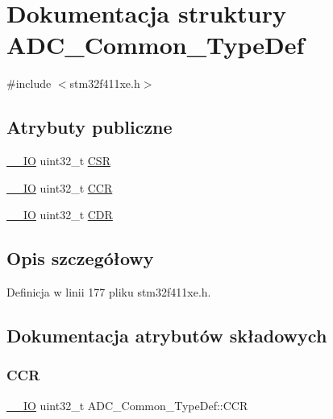 \hypertarget{struct_a_d_c___common___type_def}{}\section{Dokumentacja struktury A\+D\+C\+\_\+\+Common\+\_\+\+Type\+Def}
\label{struct_a_d_c___common___type_def}


{\ttfamily \#include $<$stm32f411xe.\+h$>$}

\subsection*{Atrybuty publiczne}
\begin{DoxyCompactItemize}
\item 
\hyperlink{core__sc300_8h_aec43007d9998a0a0e01faede4133d6be}{\+\_\+\+\_\+\+IO} uint32\+\_\+t \hyperlink{struct_a_d_c___common___type_def_ac38e24f600f9e134a54a0c43b976a4f4}{C\+SR}
\item 
\hyperlink{core__sc300_8h_aec43007d9998a0a0e01faede4133d6be}{\+\_\+\+\_\+\+IO} uint32\+\_\+t \hyperlink{struct_a_d_c___common___type_def_aee6d4af7571a1bad2fec9e7b53733277}{C\+CR}
\item 
\hyperlink{core__sc300_8h_aec43007d9998a0a0e01faede4133d6be}{\+\_\+\+\_\+\+IO} uint32\+\_\+t \hyperlink{struct_a_d_c___common___type_def_a6f7399bf70f677ef5de46a3038f414e1}{C\+DR}
\end{DoxyCompactItemize}


\subsection{Opis szczegółowy}


Definicja w linii 177 pliku stm32f411xe.\+h.



\subsection{Dokumentacja atrybutów składowych}
\mbox{\label{struct_a_d_c___common___type_def_aee6d4af7571a1bad2fec9e7b53733277}} 
\subsubsection{\texorpdfstring{C\+CR}{CCR}}
{\footnotesize\ttfamily \hyperlink{core__sc300_8h_aec43007d9998a0a0e01faede4133d6be}{\+\_\+\+\_\+\+IO} uint32\+\_\+t A\+D\+C\+\_\+\+Common\+\_\+\+Type\+Def\+::\+C\+CR}

